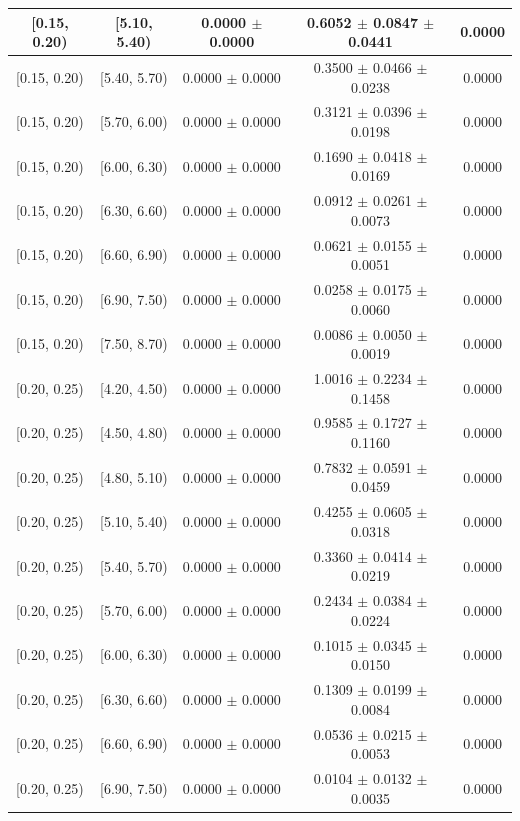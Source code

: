 \begin{longtable}{|c|c|c|c|c|}
\hline
[0.15, 0.20) & [5.10, 5.40) & 0.0000 $\pm$ 0.0000 & 0.6052 $\pm$ 0.0847 $\pm$ 0.0441 & 0.0000 \\ 
\hline
[0.15, 0.20) & [5.40, 5.70) & 0.0000 $\pm$ 0.0000 & 0.3500 $\pm$ 0.0466 $\pm$ 0.0238 & 0.0000 \\ 
\hline
[0.15, 0.20) & [5.70, 6.00) & 0.0000 $\pm$ 0.0000 & 0.3121 $\pm$ 0.0396 $\pm$ 0.0198 & 0.0000 \\ 
\hline
[0.15, 0.20) & [6.00, 6.30) & 0.0000 $\pm$ 0.0000 & 0.1690 $\pm$ 0.0418 $\pm$ 0.0169 & 0.0000 \\ 
\hline
[0.15, 0.20) & [6.30, 6.60) & 0.0000 $\pm$ 0.0000 & 0.0912 $\pm$ 0.0261 $\pm$ 0.0073 & 0.0000 \\ 
\hline
[0.15, 0.20) & [6.60, 6.90) & 0.0000 $\pm$ 0.0000 & 0.0621 $\pm$ 0.0155 $\pm$ 0.0051 & 0.0000 \\ 
\hline
[0.15, 0.20) & [6.90, 7.50) & 0.0000 $\pm$ 0.0000 & 0.0258 $\pm$ 0.0175 $\pm$ 0.0060 & 0.0000 \\ 
\hline
[0.15, 0.20) & [7.50, 8.70) & 0.0000 $\pm$ 0.0000 & 0.0086 $\pm$ 0.0050 $\pm$ 0.0019 & 0.0000 \\ 
\hline
[0.20, 0.25) & [4.20, 4.50) & 0.0000 $\pm$ 0.0000 & 1.0016 $\pm$ 0.2234 $\pm$ 0.1458 & 0.0000 \\ 
\hline
[0.20, 0.25) & [4.50, 4.80) & 0.0000 $\pm$ 0.0000 & 0.9585 $\pm$ 0.1727 $\pm$ 0.1160 & 0.0000 \\ 
\hline
[0.20, 0.25) & [4.80, 5.10) & 0.0000 $\pm$ 0.0000 & 0.7832 $\pm$ 0.0591 $\pm$ 0.0459 & 0.0000 \\ 
\hline
[0.20, 0.25) & [5.10, 5.40) & 0.0000 $\pm$ 0.0000 & 0.4255 $\pm$ 0.0605 $\pm$ 0.0318 & 0.0000 \\ 
\hline
[0.20, 0.25) & [5.40, 5.70) & 0.0000 $\pm$ 0.0000 & 0.3360 $\pm$ 0.0414 $\pm$ 0.0219 & 0.0000 \\ 
\hline
[0.20, 0.25) & [5.70, 6.00) & 0.0000 $\pm$ 0.0000 & 0.2434 $\pm$ 0.0384 $\pm$ 0.0224 & 0.0000 \\ 
\hline
[0.20, 0.25) & [6.00, 6.30) & 0.0000 $\pm$ 0.0000 & 0.1015 $\pm$ 0.0345 $\pm$ 0.0150 & 0.0000 \\ 
\hline
[0.20, 0.25) & [6.30, 6.60) & 0.0000 $\pm$ 0.0000 & 0.1309 $\pm$ 0.0199 $\pm$ 0.0084 & 0.0000 \\ 
\hline
[0.20, 0.25) & [6.60, 6.90) & 0.0000 $\pm$ 0.0000 & 0.0536 $\pm$ 0.0215 $\pm$ 0.0053 & 0.0000 \\ 
\hline
[0.20, 0.25) & [6.90, 7.50) & 0.0000 $\pm$ 0.0000 & 0.0104 $\pm$ 0.0132 $\pm$ 0.0035 & 0.0000 \\ 

\end{longtable}
